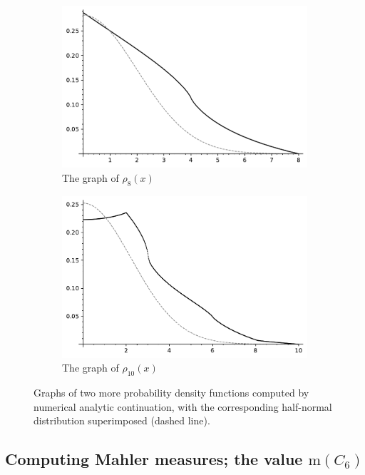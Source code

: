 \documentclass[12pt,reqno]{amsart}
\theoremstyle{definition}
\theoremstyle{plain}
\theoremstyle{definition}
\newcommand\m{\mathrm{m}}
\begin{document}
\begin{figure}
  \begin{subfigure}[h]{0.45\linewidth}
    \includegraphics[width=\linewidth]{p8.pdf}
    \caption{The graph of $\rho_8(x)$}
  \end{subfigure}
  \hfill
  \begin{subfigure}[h]{0.45\linewidth}
    \includegraphics[width=\linewidth]{p10.pdf}
    \caption{The graph of $\rho_{10}(x)$}
  \end{subfigure}%
  \caption{Graphs of two more probability density functions computed by numerical analytic continuation, with the corresponding half-normal distribution superimposed (dashed line).} \label{Fig:rho810}
\end{figure}

\subsection{Computing Mahler measures; the value $\m(C_6)$}
\end{document}
